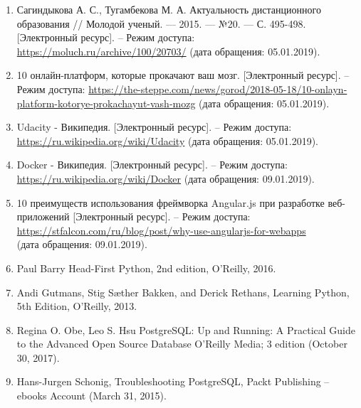 \begin{enumerate}[wide,topsep=0pt]
\itemsep0em

\item
Сагиндыкова А. С., Тугамбекова М. А.
Актуальность дистанционного образования // Молодой ученый. — 2015. — №20. — С. 495-498.
[Электронный ресурс]. – Режим доступа:
\href{https://moluch.ru/archive/100/20703/}{https://moluch.ru/archive/100/20703/}
(дата обращения: 05.01.2019).

\item
10 онлайн-платформ, которые прокачают ваш мозг.
[Электронный ресурс]. – Режим доступа:
\href{https://the-steppe.com/news/gorod/2018-05-18/10-onlayn-platform-kotorye-prokachayut-vash-mozg}{https://the-steppe.com/news/gorod/2018-05-18/10-onlayn-platform-kotorye-prokachayut-vash-mozg}
(дата обращения: 05.01.2019).

\item
Udacity - Википедия. [Электронный ресурс]. – Режим доступа:\\
\href{https://ru.wikipedia.org/wiki/Udacity}{https://ru.wikipedia.org/wiki/Udacity}
(дата обращения: 05.01.2019).

\item
Docker - Википедия. [Электронный ресурс]. – Режим доступа: \\
\href{https://ru.wikipedia.org/wiki/Docker}{https://ru.wikipedia.org/wiki/Docker}
(дата обращения: 09.01.2019).

\item
10 преимуществ использования фреймворка Angular.js при разработке веб-приложений [Электронный ресурс]. – Режим доступа:\\
\href{https://stfalcon.com/ru/blog/post/why-use-angularjs-for-webapps}{https://stfalcon.com/ru/blog/post/why-use-angularjs-for-webapps}\\
(дата обращения: 09.01.2019).

\item
Paul Barry
Head-First Python, 2nd edition,
O’Reilly,
2016.

\item
Andi Gutmans, Stig Sæther Bakken, and Derick Rethans,
Learning Python, 5th Edition,
O’Reilly,
2013.

\item
Regina O. Obe, Leo S. Hsu
PostgreSQL: Up and Running: A Practical Guide to the Advanced Open Source Database
O'Reilly Media; 3 edition (October 30, 2017).

\item
Hans-Jurgen Schonig,
Troubleshooting PostgreSQL,
Packt Publishing – \\ebooks Account (March 31, 2015).


\end{enumerate}

